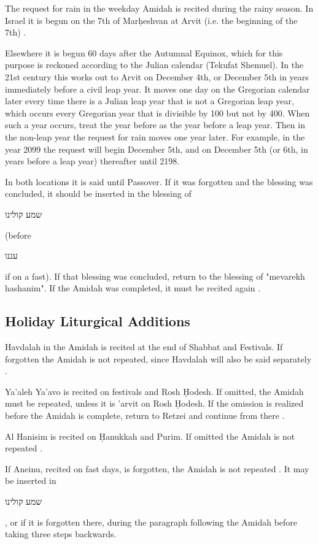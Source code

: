 \documentclass[11pt]{article}
\newcommand{\hebword}[1]{‎\begin{hebrew}\beginR #1 \endR\end{hebrew}}
\begin{document}
The request for rain in the weekday Amidah is recited during the rainy season.  In Israel it is begun on the 7th of Mar\d{h}eshvan at Arvit (i.e. the beginning of the 7th) \parencite*[18:5 citing OC 117]{PH}.

Elsewhere it is begun 60 days after the Autumnal Equinox, which for this purpose is reckoned according to the Julian calendar (Tekufat Shemuel).  In the 21st century this works out to Arvit on December 4th, or December 5th in years immediately before a civil leap year.  It moves one day on the Gregorian calendar later every time there is a Julian leap year that is not a Gregorian leap year, which occurs every Gregorian year that is divisible by 100 but not by 400. When such a year occurs, treat the year before as the year before a leap year.  Then in the non-leap year the request for rain moves one year later.  For example, in the year 2099 the request will begin December 5th, and on December 5th (or 6th, in years before a leap year) thereafter until 2198.

In both locations it is said until Passover. If it was forgotten and the blessing was concluded, it should be inserted in the blessing of \hebword{שמע קולינו} (before \hebword{עננו} if on a fast). If that blessing was concluded, return to the blessing of "mevarekh hashanim".  If the Amidah was completed, it must be recited again \parencite*{PH}.

\subsection{Holiday Liturgical Additions}

Havdalah in the Amidah is recited at the end of Shabbat and Festivals.  If forgotten the Amidah is not repeated, since Havdalah will also be said separately \parencite*[18:2 citing OC 422]{PH}.

Ya'aleh Ya'avo is recited on festivals and Rosh \d{H}odesh.  If omitted, the Amidah must be repeated, unless it is 'arvit on Rosh \d{H}odesh.  If the omission is realized before the Amidah is complete, return to Retzei and continue from there \parencite{PH}.

Al Hanisim is recited on \d{H}anukkah and Purim.  If omitted the Amidah is not repeated \parencite*[citing OC 682]{PH}.

If Aneinu, recited on fast days, is forgotten, the Amidah is not repeated \parencite*[citing OC 565]{PH}. It may be inserted in \hebword{שמע קולינו}, or if it is forgotten there, during the paragraph following the Amidah before taking three steps backwards.
\end{document}
